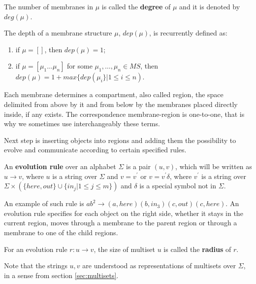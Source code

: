 \begin{definition}
  The number of membranes in $\mu$ is called the {\bf degree} of $\mu$ and it is denoted by $deg(\mu)$.
\end{definition}

\begin{definition}
  The depth of a membrane structure $\mu$, $dep(\mu)$, is recurrently defined as:
  \begin{enumerate}
    \item if $\mu = []$, then $dep(\mu) = 1$;
    \item if $\mu = [\mu_1\ldots\mu_n]$ for some $\mu_1, \ldots, \mu_n\in MS$, then $dep(\mu) = 1 + max\{dep(\mu_i\} | 1\leq i\leq n)$.
  \end{enumerate}
\end{definition}

Each membrane determines a compartment, also called region, the space delimited from above by it and from below by the membranes placed directly inside, if any exists. The correspondence membrane-region is one-to-one, that is why we sometimes use interchangeably these terms.


Next step is inserting objects into regions and adding them the possibility to evolve and communicate according to certain specified rules.

\begin{definition}
\label{def:evolution_rule}
  An {\bf evolution rule} over an alphabet $\Sigma$ is a pair $(u,v)$, which will be written as $u\rightarrow v$, where $u$ is a string over $\Sigma$ and $v=v^\prime$ or $v=v^\prime\delta$, where $v^\prime$ is a string over $\Sigma\times(\{here, out\}\cup\{in_j|1\leq j\leq m\})$ and $\delta$ is a special symbol not in $\Sigma$.
\end{definition}

An example of such rule is $ab^2\rightarrow (a,here)(b,in_3)(c,out)(c,here)$. An evolution rule specifies for each object on the right side, whether it stays in the current region, moves through a membrane to the parent region or through a membrane to one of the child regions.

\begin{definition}
  For an evolution rule $r: u\rightarrow v$, the size of multiset $u$ is called the {\bf radius} of $r$.
\end{definition}

Note that the strings $u, v$ are understood as representations of multisets over $\Sigma$, in a sense from section \ref{sec:multisets}.


